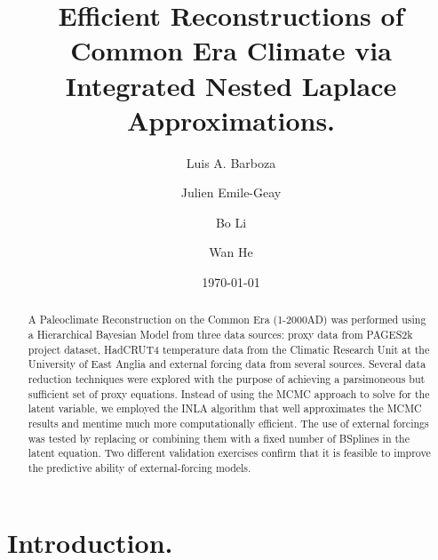\documentclass[12pt]{amsart}
\theoremstyle{plain}
\theoremstyle{definition}
\theoremstyle{remark}
\begin{document}
\doublespacing
\title[]{Efficient Reconstructions of Common Era Climate via Integrated Nested Laplace Approximations.}

\author[]{Luis A. Barboza}
\address{Centro de Investigacion en Matematica Pura y Aplicada (CIMPA)-Escuela
  de Matematica, Universidad de Costa Rica\\
San Jos\'e, Costa Rica}


\author[]{Julien Emile-Geay}
\address{Department of Earth Sciences \\
  University of Southern California \\
  Los Angeles, California, USA.
}


\author[]{Bo Li}
\address{Department of Statistics \\
  University of Illinois at Urbana-Champaign \\
  Champaign, Illinois, USA.
}

\author[]{Wan He}

\date{\today}
\subjclass[2010]{}
\maketitle

\begin{abstract}
A Paleoclimate Reconstruction on the Common Era (1-2000AD) was performed using a
Hierarchical Bayesian Model from three data sources: proxy data from PAGES2k
project dataset, HadCRUT4 temperature data from the Climatic Research Unit
at the University of East Anglia and external forcing data from several sources.
Several data reduction techniques were explored with the purpose of achieving a parsimoneous but sufficient set of
proxy equations. Instead of using the MCMC approach to solve for the latent variable, we employed the
INLA algorithm that well approximates the MCMC results and mentime much more computationally efficient. The use
of external forcings was tested by replacing or combining them with a fixed number of
BSplines in the latent equation. Two different validation exercises confirm that
it is feasible to improve the predictive ability of external-forcing models. 
\end{abstract}

\section{Introduction.}
\label{sec:intro}
\end{document}
